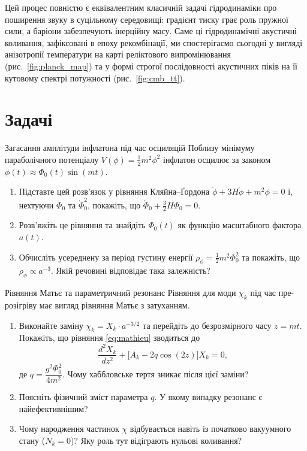 Цей процес повністю є еквівалентним класичній задачі гідродинаміки про поширення звуку в суцільному середовищі: градієнт тиску грає роль пружної сили, а баріони забезпечують інерційну масу. Саме ці гідродинамічні акустичні коливання, зафіксовані в епоху рекомбінації, ми спостерігаємо сьогодні у вигляді анізотропії температури на карті реліктового випромінювання (рис.~\ref{fig:planck_map}) та у формі строгої послідовності акустичних піків на її кутовому спектрі потужності (рис.~\ref{fig:cmb_tt}).


\section*{Задачі}

\begin{problem}{Загасання амплітуди інфлатона під час осциляцій}
Поблизу мінімуму параболічного потенціалу $V(\phi) = \frac{1}{2}m^2\phi^2$
інфлатон осцилює за законом $\phi(t) \approx \Phi_0(t)\sin(mt)$.

\begin{enumerate}
    \item Підставте цей розв'язок у рівняння Кляйна--Ґордона
          $\ddot{\phi} + 3H\dot{\phi} + m^2\phi = 0$ і, нехтуючи $\ddot{\Phi}_0$ та $\dot{\Phi}_0^2$,
          покажіть, що $\dot{\Phi}_0 + \frac{3}{2}H\Phi_0 = 0$.
    \item Розв'яжіть це рівняння та знайдіть $\Phi_0(t)$ як функцію масштабного фактора $a(t)$.
    \item Обчисліть усереднену за період густину енергії $\rho_\phi = \frac{1}{2}m^2\Phi_0^2$
          та покажіть, що $\rho_\phi \propto a^{-3}$. Якій речовині відповідає така залежність?
\end{enumerate}
\end{problem}


\begin{problem}{Рівняння Матьє та параметричний резонанс}
Рівняння для моди $\chi_k$ під час пре-розігріву має вигляд
рівняння Матьє з затуханням.

\begin{enumerate}
    \item Виконайте заміну $\chi_k = X_k \cdot a^{-3/2}$ та перейдіть до безрозмірного
          часу $z = mt$. Покажіть, що рівняння \eqref{eq:mathieu} зводиться до
          \[
          \frac{d^2 X_k}{dz^2} + \bigl[A_k - 2q\cos(2z)\bigr] X_k = 0,
          \]
          де $q = \dfrac{g^2\Phi_0^2}{4m^2}$. Чому хаббловське тертя зникає після цієї заміни?
    \item Поясніть фізичний зміст параметра $q$. У якому випадку резонанс є найефективнішим?
    \item Чому народження частинок $\chi$ відбувається навіть із початково вакуумного стану
          ($N_k = 0$)? Яку роль тут відіграють нульові коливання?
\end{enumerate}
\end{problem}

